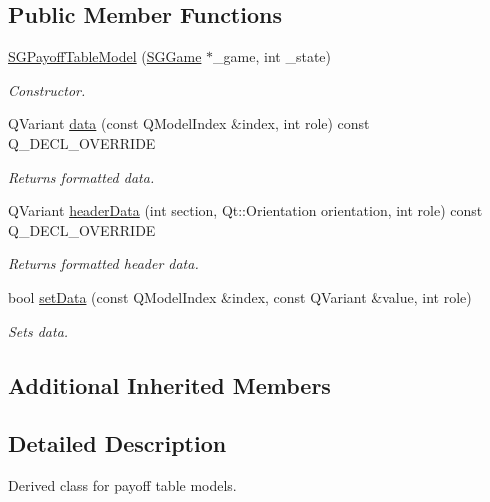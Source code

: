 \subsection*{Public Member Functions}
\begin{DoxyCompactItemize}
\item 
\mbox{\label{classSGPayoffTableModel_ab6768d4b56d310752769d6b4eb094323}} 
\hyperlink{classSGPayoffTableModel_ab6768d4b56d310752769d6b4eb094323}{S\+G\+Payoff\+Table\+Model} (\hyperlink{classSGGame}{S\+G\+Game} $\ast$\+\_\+game, int \+\_\+state)
\begin{DoxyCompactList}\small\item\em Constructor. \end{DoxyCompactList}\item 
Q\+Variant \hyperlink{classSGPayoffTableModel_ad47a81403a6442bd2fb879b52beea8c1}{data} (const Q\+Model\+Index \&index, int role) const Q\+\_\+\+D\+E\+C\+L\+\_\+\+O\+V\+E\+R\+R\+I\+DE
\begin{DoxyCompactList}\small\item\em Returns formatted data. \end{DoxyCompactList}\item 
Q\+Variant \hyperlink{classSGPayoffTableModel_a8473c095d2a00721bd36c196f2b90b95}{header\+Data} (int section, Qt\+::\+Orientation orientation, int role) const Q\+\_\+\+D\+E\+C\+L\+\_\+\+O\+V\+E\+R\+R\+I\+DE
\begin{DoxyCompactList}\small\item\em Returns formatted header data. \end{DoxyCompactList}\item 
bool \hyperlink{classSGPayoffTableModel_a9be799422c8a564a00911e959c795b5d}{set\+Data} (const Q\+Model\+Index \&index, const Q\+Variant \&value, int role)
\begin{DoxyCompactList}\small\item\em Sets data. \end{DoxyCompactList}\end{DoxyCompactItemize}
\subsection*{Additional Inherited Members}


\subsection{Detailed Description}
Derived class for payoff table models. 

